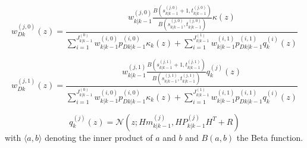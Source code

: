 \documentclass{article}
\newcommand{\clut}{{(0)}}
\newcommand{\tgt}{{(1)}}
\newcommand{\clutj}{{(j,0)}}
\newcommand{\tgtj}{{(j,1)}}
\newcommand{\cluti}{{(i,0)}}
\newcommand{\tgti}{{(i,1)}}
\begin{document}
\begin{equation}
  \label{eq:lpdwD0}
  w_{Dk}^\clutj(z) = \frac{w_{k|k-1}^\clutj  \frac{B\left( s_{k|k-1}^\clutj+1,t_{k|k-1}^\clutj\right)}{B\left( s_{k|k-1}^\clutj,t_{k|k-1}^\clutj\right)}\kappa(z)}
  {\sum_{i=1}^{J_{k|k-1}^\clut}w_{k|k-1}^\cluti p_{Dk|k-1}^\cluti\kappa_k(z) +  \sum_{i=1}^{J_{k|k-1}^\tgt}w_{k|k-1}^\tgti p_{Dk|k-1}^\tgti q_k^{(i)}(z)  }
\end{equation}

\begin{equation}
  \label{eq:lpdwD1}
  w_{Dk}^\tgtj(z) = \frac{w_{k|k-1}^\tgtj  \frac{B\left( s_{k|k-1}^\tgtj+1,t_{k|k-1}^\tgtj\right)}{B\left( s_{k|k-1}^\tgtj,t_{k|k-1}^\tgtj\right)}q_k^{(j)}(z)}
  {\sum_{i=1}^{J_{k|k-1}^\clut}w_{k|k-1}^\cluti p_{Dk|k-1}^\cluti\kappa_k(z) +  \sum_{i=1}^{J_{k|k-1}^\tgt}w_{k|k-1}^\tgti p_{Dk|k-1}^\tgti q_k^{(i)}(z)  }
\end{equation}

\begin{equation}
  \label{eq:qz}
  q_k^{(j)}(z) = \mathcal{N}(z;Hm_{k|k-1}^{(j)}, HP_{k|k-1}^{(j)}H^T + R)
\end{equation}
with $\langle a, b \rangle$ denoting the inner product of $a$ and $b$ and $B(a, b)$ the Beta function.
\end{document}
